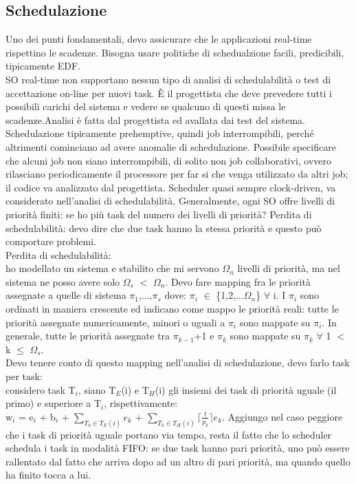 \documentclass[12pt, oneside]{extbook}
\begin{document}
\subsection{Schedulazione}
Uno dei punti fondamentali, devo assicurare che le applicazioni real-time rispettino le scadenze. Bisogna usare politiche di schedualzione facili, predicibili, tipicamente EDF.\\ SO real-time non supportano nessun tipo di analisi di schedulabilità o test di accettazione on-line per nuovi task. È il progettista che deve prevedere tutti i possibili carichi del sistema e vedere se qualcuno di questi missa le scadenze.Analisi è fatta dal progettista ed avallata dai test del sistema.\\ Schedulazione tipicamente prehemptive, quindi job interrompibili, perché altrimenti cominciano ad avere anomalie di schedulazione. Possibile specificare che alcuni job non siano interrompibili, di solito non job collaborativi, ovvero rilasciano periodicamente il processore per far si che venga utilizzato da altri job; il codice va analizzato dal progettista. Scheduler quasi sempre clock-driven, va considerato nell'analisi di schedulabilità. Generalmente, ogni SO offre livelli di priorità finiti: se ho più task del numero dei livelli di priorità? Perdita di schedulabilità: devo dire che due task hanno la stessa priorità e questo può comportare problemi.\\ Perdita di schedulabilità:\\ ho modellato un sistema e stabilito che mi servono $\Omega_n$ livelli di priorità, ma nel sistema ne posso avere solo $\Omega_s$ $<$ $\Omega_n$. Devo fare mapping fra le priorità assegnate a quelle di sistema $\pi_1$,...,$\pi_s$ dove: $\pi_i$ $\in$ \{1,2,...$\Omega_n$\} $\forall$ i. I $\pi_i$ sono ordinati in maniera crescente ed indicano come mappo le priorità reali: tutte le priorità assegnate numericamente, minori o uguali a $\pi_i$ sono mappate su $\pi_i$. In generale, tutte le priorità assegnate tra $\pi_{k-1}$+1 e $\pi_k$ sono mappate su $\pi_k$ $\forall$ 1 $<$ k $\leq$ $\Omega_s$.\\ Devo tenere conto di questo mapping nell'analisi di schedulazione, devo farlo task per task:\\ considero task T$_i$, siano T$_E$(i) e T$_H$(i) gli insiemi dei task di priorità uguale (il primo) e superiore a T$_i$, rispettivamente:\\ w$_i$ = e$_i$ + b$_i$ + $\sum\limits_{T_k \in T_E(i)} e_k$ + $\sum\limits_{T_k \in T_H(i)} \lceil \frac{t}{p_k} \rceil e_k$. Aggiungo nel caso peggiore che i task di priorità uguale portano via tempo, resta il fatto che lo scheduler schedula i task in modalità FIFO: se due task hanno pari priorità, uno può essere rallentato dal fatto che arriva dopo ad un altro di pari priorità, ma quando quello ha finito tocca a lui.\\
\end{document}
